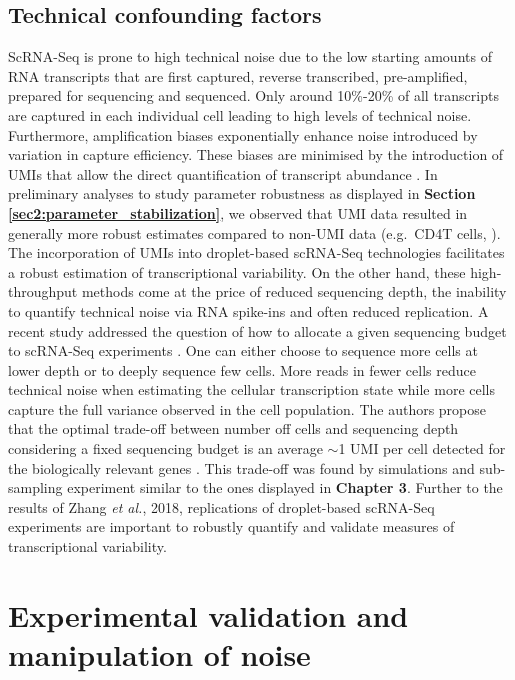 \subsection{Technical confounding factors}

ScRNA-Seq is prone to high technical noise due to the low starting amounts of RNA transcripts that are first captured, reverse transcribed, pre-amplified, prepared for sequencing and sequenced. Only around 10\%-20\% of all transcripts are captured in each individual cell leading to high levels of technical noise. Furthermore, amplification biases exponentially enhance noise introduced by variation in capture efficiency. These biases are minimised by the introduction of \glspl{UMI} that allow the direct quantification of transcript abundance \cite{Islam2014}. In preliminary analyses to study parameter robustness as displayed in \textbf{Section \ref{sec2:parameter_stabilization}}, we observed that UMI data \citep{Zeisel2015} resulted in generally more robust estimates compared to non-UMI data (e.g.~CD4\plus T cells, \citep{Martinez-jimenez2017}).\\

The incorporation of UMIs into droplet-based scRNA-Seq technologies facilitates a robust estimation of transcriptional variability. On the other hand, these high-throughput methods come at the price of reduced sequencing depth, the inability to quantify technical noise via RNA spike-ins and often reduced replication. A recent study addressed the question of how to allocate a given sequencing budget to scRNA-Seq experiments \citep{Zhang2018}. One can either choose to sequence more cells at lower depth or to  deeply sequence few cells. More reads in fewer cells reduce technical noise when estimating the cellular transcription state while more cells capture the full variance observed in the cell population. The authors propose that the optimal trade-off between number off cells and sequencing depth considering a fixed sequencing budget is an average $\sim$1 UMI per cell detected for the biologically relevant genes \citep{Zhang2018}. This trade-off was found by simulations and sub-sampling experiment similar to the ones displayed in \textbf{Chapter 3}. Further to the results of Zhang \emph{et al.}, 2018, replications of droplet-based scRNA-Seq experiments are important to robustly quantify and validate measures of transcriptional variability. 

\section{Experimental validation and manipulation of noise}

